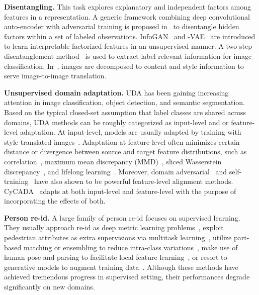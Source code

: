 \documentclass[runningheads]{llncs}
\begin{document}
\textbf{Disentangling.} This task explores explanatory and independent factors among features in a representation. A generic framework combining deep convolutional auto-encoder with adversarial training is proposed in~\cite{mathieu2016disentangling} to disentangle hidden factors within a set of labeled observations. InfoGAN~\cite{chen2016infogan} and -VAE~\cite{higgins2017beta} are introduced to learn interpretable factorized features in an unsupervised manner. A two-step disentanglement method~\cite{hadad2018two} is used to extract label relevant information for image classification. In~\cite{Huang_2018_ECCV,lee2018diverse}, images are decomposed to content and style information to serve image-to-image translation. 

 



\noindent\textbf{Unsupervised domain adaptation.} UDA has been gaining increasing attention in image classification, object detection, and semantic segmentation. Based on the typical closed-set assumption that label classes are shared across domains, UDA methods can be roughly categorized as input-level and or feature-level adaptation. At input-level, models are usually adapted by training with style translated images~\cite{dundar2020domain,Huang_2018_ECCV,lee2018diverse}. Adaptation at feature-level often minimizes certain distance or divergence between source and target feature distributions, such as correlation~\cite{sun2016deep}, maximum mean discrepancy (MMD)~\cite{long2015learning}, sliced Wasserstein discrepancy~\cite{lee2019sliced}, and lifelong learning~\cite{chen2020automated}. Moreover, domain adversarial~\cite{hong2018conditional,tzeng2017adversarial} and self-training~\cite{chen2020angular,Ge2020Mutual,zou2018unsupervised,Zou_2019_ICCV} have also shown to be powerful feature-level alignment methods. CyCADA~\cite{hoffman2018cycada} adapts at both input-level and feature-level with the purpose of incorporating the effects of both. 








\noindent\textbf{Person re-id.} A large family of person re-id focuses on supervised learning. They usually approach re-id as deep metric learning problems~\cite{Fan_2020_CVPR,hermans2017defense}, exploit pedestrian attributes as extra supervisions via multitask learning~\cite{su2016deep,wang2018transferable}, utilize part-based matching or ensembling to reduce intra-class variations~\cite{su2017pose,wei2017glad}, make use of human pose and parsing to facilitate local feature learning~\cite{semantic-parsing,zheng2020person}, or resort to generative models to augment training data~\cite{ge2018fd,zheng2019joint}. Although these methods have achieved tremendous progress in supervised setting, their performances degrade significantly on new domains.
\end{document}
